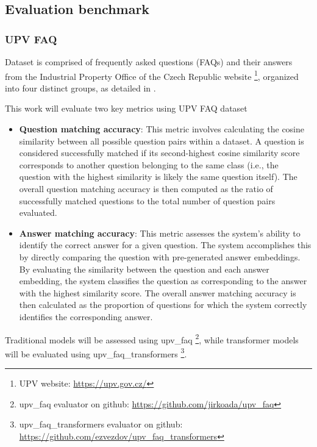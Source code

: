 \subsection{Evaluation  benchmark}

\subsubsection{UPV FAQ}

Dataset is comprised of frequently asked questions (FAQs) and their answers from the Industrial Property Office of the Czech Republic website \footnote{UPV website: \url{https://upv.gov.cz/}}, organized into four distinct groups, as detailed in .

This work will evaluate two key metrics using UPV FAQ dataset
\begin{itemize}
  \item \textbf{Question matching accuracy}:
    This metric involves calculating the cosine similarity between all possible question pairs within a dataset.
    A question is considered successfully matched if its second-highest cosine similarity score corresponds to another question belonging to the same class (i.e., the question with the highest similarity is likely the same question itself). 
    The overall question matching accuracy is then computed as the ratio of successfully matched questions to the total number of question pairs evaluated.  
  \item \textbf{Answer matching accuracy}:
    This metric assesses the system's ability to identify the correct answer for a given question.
    The system accomplishes this by directly comparing the question with pre-generated answer embeddings.
    By evaluating the similarity between the question and each answer embedding, the system classifies the question as corresponding to the answer with the highest similarity score.
    The overall answer matching accuracy is then calculated as the proportion of questions for which the system correctly identifies the corresponding answer.  
\end{itemize}



Traditional models will be assessed using upv\_faq \footnote{upv\_faq evaluator on github: \url{https://github.com/jirkoada/upv_faq}}, while transformer models will be evaluated using upv\_faq\_transformers \footnote{upv\_faq\_transformers evaluator on github: \url{https://github.com/ezvezdov/upv_faq_transformers}}.


